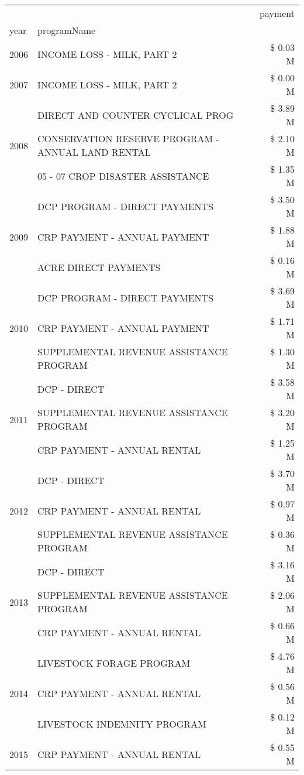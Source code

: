 \begin{tabular}{llr}
\toprule
 &  & payment \\
year & programName &  \\
\midrule
2006 & INCOME LOSS - MILK, PART 2 & \$ 0.03 M \\
\cline{1-3}
2007 & INCOME LOSS - MILK, PART 2 & \$ 0.00 M \\
\cline{1-3}
\multirow[t]{3}{*}{2008} & DIRECT AND COUNTER CYCLICAL PROG & \$ 3.89 M \\
 & CONSERVATION RESERVE PROGRAM - ANNUAL LAND RENTAL & \$ 2.10 M \\
 & 05 - 07 CROP DISASTER ASSISTANCE & \$ 1.35 M \\
\cline{1-3}
\multirow[t]{3}{*}{2009} & DCP PROGRAM - DIRECT PAYMENTS & \$ 3.50 M \\
 & CRP PAYMENT - ANNUAL PAYMENT & \$ 1.88 M \\
 & ACRE DIRECT PAYMENTS & \$ 0.16 M \\
\cline{1-3}
\multirow[t]{3}{*}{2010} & DCP PROGRAM - DIRECT PAYMENTS & \$ 3.69 M \\
 & CRP PAYMENT - ANNUAL PAYMENT & \$ 1.71 M \\
 & SUPPLEMENTAL REVENUE ASSISTANCE PROGRAM & \$ 1.30 M \\
\cline{1-3}
\multirow[t]{3}{*}{2011} & DCP - DIRECT & \$ 3.58 M \\
 & SUPPLEMENTAL REVENUE ASSISTANCE PROGRAM & \$ 3.20 M \\
 & CRP PAYMENT - ANNUAL RENTAL & \$ 1.25 M \\
\cline{1-3}
\multirow[t]{3}{*}{2012} & DCP - DIRECT & \$ 3.70 M \\
 & CRP PAYMENT - ANNUAL RENTAL & \$ 0.97 M \\
 & SUPPLEMENTAL REVENUE ASSISTANCE PROGRAM & \$ 0.36 M \\
\cline{1-3}
\multirow[t]{3}{*}{2013} & DCP - DIRECT & \$ 3.16 M \\
 & SUPPLEMENTAL REVENUE ASSISTANCE PROGRAM & \$ 2.06 M \\
 & CRP PAYMENT - ANNUAL RENTAL & \$ 0.66 M \\
\cline{1-3}
\multirow[t]{3}{*}{2014} & LIVESTOCK FORAGE PROGRAM & \$ 4.76 M \\
 & CRP PAYMENT - ANNUAL RENTAL & \$ 0.56 M \\
 & LIVESTOCK INDEMNITY PROGRAM & \$ 0.12 M \\
\cline{1-3}
\multirow[t]{3}{*}{2015} & CRP PAYMENT - ANNUAL RENTAL & \$ 0.55 M \\

\end{tabular}
